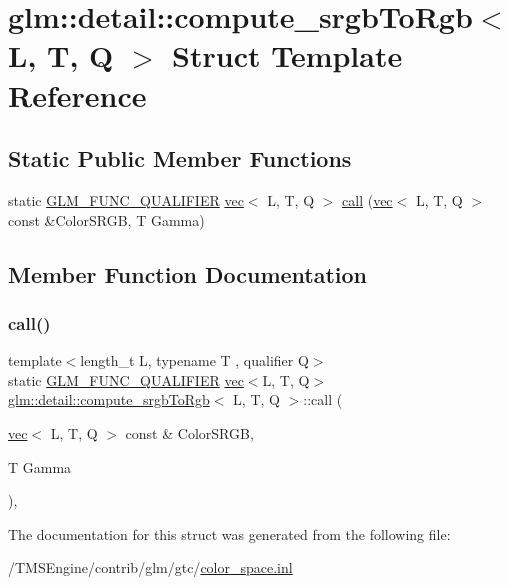 \hypertarget{structglm_1_1detail_1_1compute__srgb_to_rgb}{}\section{glm\+:\+:detail\+:\+:compute\+\_\+srgb\+To\+Rgb$<$ L, T, Q $>$ Struct Template Reference}
\label{structglm_1_1detail_1_1compute__srgb_to_rgb}
\subsection*{Static Public Member Functions}
\begin{DoxyCompactItemize}
\item 
static \hyperlink{setup_8hpp_a33fdea6f91c5f834105f7415e2a64407}{G\+L\+M\+\_\+\+F\+U\+N\+C\+\_\+\+Q\+U\+A\+L\+I\+F\+I\+ER} \hyperlink{structglm_1_1vec}{vec}$<$ L, T, Q $>$ \hyperlink{structglm_1_1detail_1_1compute__srgb_to_rgb_ab3c2c31d63a2548991596b8e460c4db7}{call} (\hyperlink{structglm_1_1vec}{vec}$<$ L, T, Q $>$ const \&Color\+S\+R\+GB, T Gamma)
\end{DoxyCompactItemize}


\subsection{Member Function Documentation}
\mbox{\label{structglm_1_1detail_1_1compute__srgb_to_rgb_ab3c2c31d63a2548991596b8e460c4db7}} 
\subsubsection{\texorpdfstring{call()}{call()}}
{\footnotesize\ttfamily template$<$length\+\_\+t L, typename T , qualifier Q$>$ \\
static \hyperlink{setup_8hpp_a33fdea6f91c5f834105f7415e2a64407}{G\+L\+M\+\_\+\+F\+U\+N\+C\+\_\+\+Q\+U\+A\+L\+I\+F\+I\+ER} \hyperlink{structglm_1_1vec}{vec}$<$L, T, Q$>$ \hyperlink{structglm_1_1detail_1_1compute__srgb_to_rgb}{glm\+::detail\+::compute\+\_\+srgb\+To\+Rgb}$<$ L, T, Q $>$\+::call (\begin{DoxyParamCaption}\item[{\hyperlink{structglm_1_1vec}{vec}$<$ L, T, Q $>$ const \&}]{Color\+S\+R\+GB,  }\item[{T}]{Gamma }\end{DoxyParamCaption})\hspace{0.3cm}{\ttfamily [inline]}, {\ttfamily [static]}}



The documentation for this struct was generated from the following file\+:\begin{DoxyCompactItemize}
\item 
/\+T\+M\+S\+Engine/contrib/glm/gtc/\hyperlink{gtc_2color__space_8inl}{color\+\_\+space.\+inl}\end{DoxyCompactItemize}
